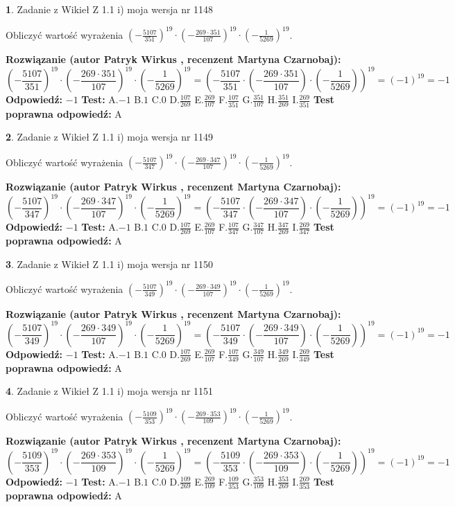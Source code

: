 \documentclass[12pt, a4paper]{article}
\theoremstyle{definition} %
\newtheorem{zad}{}
\newcommand{\zadStart}[1]{\begin{zad}#1\newline}
\newcommand{\zadStop}{\end{zad}}
\newcommand{\rozwStart}[2]{\noindent \textbf{Rozwiązanie (autor #1 , recenzent #2): }\newline}
\newcommand{\rozwStop}{\newline}
\newcommand{\odpStart}{\noindent \textbf{Odpowiedź:}\newline}
\newcommand{\odpStop}{\newline}
\newcommand{\testStart}{\noindent \textbf{Test:}\newline}
\newcommand{\testStop}{\newline}
\newcommand{\kluczStart}{\noindent \textbf{Test poprawna odpowiedź:}\newline}
\newcommand{\kluczStop}{\newline}
\begin{document}
\zadStart{Zadanie z Wikieł Z 1.1 i) moja wersja nr 1148}

Obliczyć wartość wyrażenia $(-\frac{5107}{351})^{19} \cdot (-\frac{269 \cdot 351}{107})^{19} \cdot (-\frac{1}{5269})^{19}$.
\zadStop
\rozwStart{Patryk Wirkus}{Martyna Czarnobaj}
$$(-\frac{5107}{351})^{19} \cdot (-\frac{269 \cdot 351}{107})^{19} \cdot (-\frac{1}{5269})^{19} = (-\frac{5107}{351} \cdot (-\frac{269 \cdot 351}{107}) \cdot (-\frac{1}{5269}))^{19} = (-1)^{19} = -1$$
\rozwStop
\odpStart
$-1$
\odpStop
\testStart
A.$-1$ B.$1$ C.$0$ D.$\frac{107}{269}$ E.$\frac{269}{107}$
F.$\frac{107}{351}$ G.$\frac{351}{107}$
H.$\frac{351}{269}$
I.$\frac{269}{351}$
\testStop
\kluczStart
A
\kluczStop



\zadStart{Zadanie z Wikieł Z 1.1 i) moja wersja nr 1149}

Obliczyć wartość wyrażenia $(-\frac{5107}{347})^{19} \cdot (-\frac{269 \cdot 347}{107})^{19} \cdot (-\frac{1}{5269})^{19}$.
\zadStop
\rozwStart{Patryk Wirkus}{Martyna Czarnobaj}
$$(-\frac{5107}{347})^{19} \cdot (-\frac{269 \cdot 347}{107})^{19} \cdot (-\frac{1}{5269})^{19} = (-\frac{5107}{347} \cdot (-\frac{269 \cdot 347}{107}) \cdot (-\frac{1}{5269}))^{19} = (-1)^{19} = -1$$
\rozwStop
\odpStart
$-1$
\odpStop
\testStart
A.$-1$ B.$1$ C.$0$ D.$\frac{107}{269}$ E.$\frac{269}{107}$
F.$\frac{107}{347}$ G.$\frac{347}{107}$
H.$\frac{347}{269}$
I.$\frac{269}{347}$
\testStop
\kluczStart
A
\kluczStop



\zadStart{Zadanie z Wikieł Z 1.1 i) moja wersja nr 1150}

Obliczyć wartość wyrażenia $(-\frac{5107}{349})^{19} \cdot (-\frac{269 \cdot 349}{107})^{19} \cdot (-\frac{1}{5269})^{19}$.
\zadStop
\rozwStart{Patryk Wirkus}{Martyna Czarnobaj}
$$(-\frac{5107}{349})^{19} \cdot (-\frac{269 \cdot 349}{107})^{19} \cdot (-\frac{1}{5269})^{19} = (-\frac{5107}{349} \cdot (-\frac{269 \cdot 349}{107}) \cdot (-\frac{1}{5269}))^{19} = (-1)^{19} = -1$$
\rozwStop
\odpStart
$-1$
\odpStop
\testStart
A.$-1$ B.$1$ C.$0$ D.$\frac{107}{269}$ E.$\frac{269}{107}$
F.$\frac{107}{349}$ G.$\frac{349}{107}$
H.$\frac{349}{269}$
I.$\frac{269}{349}$
\testStop
\kluczStart
A
\kluczStop



\zadStart{Zadanie z Wikieł Z 1.1 i) moja wersja nr 1151}

Obliczyć wartość wyrażenia $(-\frac{5109}{353})^{19} \cdot (-\frac{269 \cdot 353}{109})^{19} \cdot (-\frac{1}{5269})^{19}$.
\zadStop
\rozwStart{Patryk Wirkus}{Martyna Czarnobaj}
$$(-\frac{5109}{353})^{19} \cdot (-\frac{269 \cdot 353}{109})^{19} \cdot (-\frac{1}{5269})^{19} = (-\frac{5109}{353} \cdot (-\frac{269 \cdot 353}{109}) \cdot (-\frac{1}{5269}))^{19} = (-1)^{19} = -1$$
\rozwStop
\odpStart
$-1$
\odpStop
\testStart
A.$-1$ B.$1$ C.$0$ D.$\frac{109}{269}$ E.$\frac{269}{109}$
F.$\frac{109}{353}$ G.$\frac{353}{109}$
H.$\frac{353}{269}$
I.$\frac{269}{353}$
\testStop
\kluczStart
A
\kluczStop
\end{document}
